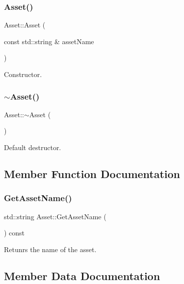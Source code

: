 \subsubsection{\texorpdfstring{Asset()}{Asset()}}
{\footnotesize\ttfamily Asset\+::\+Asset (\begin{DoxyParamCaption}\item[{const std\+::string \&}]{asset\+Name }\end{DoxyParamCaption})}

Constructor. \mbox{\label{class_asset_a46a781917d9ef0be7d6efe79390fe4e6}} 
\subsubsection{\texorpdfstring{$\sim$\+Asset()}{~Asset()}}
{\footnotesize\ttfamily Asset\+::$\sim$\+Asset (\begin{DoxyParamCaption}{ }\end{DoxyParamCaption})\hspace{0.3cm}{\ttfamily [virtual]}}

Default destructor. 

\subsection{Member Function Documentation}
\mbox{\label{class_asset_a7a2d56b7eae0869a5c4fef6a5ca84436}} 
\subsubsection{\texorpdfstring{Get\+Asset\+Name()}{GetAssetName()}}
{\footnotesize\ttfamily std\+::string Asset\+::\+Get\+Asset\+Name (\begin{DoxyParamCaption}{ }\end{DoxyParamCaption}) const\hspace{0.3cm}{\ttfamily [inline]}}

Retunrs the name of the asset. 

\subsection{Member Data Documentation}
\mbox{\label{class_asset_a7333657af418ff8386d70be9771d00cc}} 
